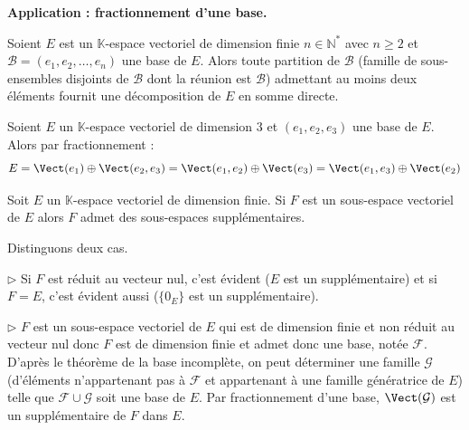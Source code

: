 \documentclass[french,11pt,twoside]{VcCours}
\begin{document}
\textbf{Application : fractionnement d'une base.}

Soient $E$ est un $\mathbb{K}$-espace vectoriel de dimension finie $n \in \mathbb{N}^*$ avec $n \geq 2$ et $\mathcal{B}=(e_1, e_2, \ldots, e_n)$ une base de $E$. Alors toute partition de $\mathcal{B}$ (famille de sous-ensembles disjoints de $\mathcal{B}$ dont la réunion est $\mathcal{B}$) admettant au moins deux éléments fournit une décomposition de $E$ en somme directe.

\medskip

\begin{Exemple} Soient $E$ un $\mathbb{K}$-espace vectoriel de dimension $3$ et $(e_1,e_2,e_3)$ une base de $E$. Alors par fractionnement :
$$ E = \Vect(e_1) \oplus \Vect(e_2,e_3) = \Vect(e_1,e_2) \oplus \Vect(e_3) = \Vect(e_1,e_3) \oplus \Vect(e_2) $$
\end{Exemple}

\medskip

\begin{Corollaire}{} Soit $E$ un $\mathbb{K}$-espace vectoriel de dimension finie. Si $F$ est un sous-espace vectoriel de $E$ alors $F$ admet des sous-espaces supplémentaires.
\end{Corollaire}

\begin{Demonstration}{} Distinguons deux cas.

$\rhd$ Si $F$ est réduit au vecteur nul, c'est évident ($E$ est un supplémentaire) et si $F=E$, c'est évident aussi ($\lbrace 0_E\rbrace$ est un supplémentaire).

\medskip

$\rhd$ $F$ est un sous-espace vectoriel de $E$ qui est de dimension finie et non réduit au vecteur nul donc $F$ est de dimension finie et admet donc une base, notée $\mathcal{F}$. D'après le théorème de la base incomplète, on peut déterminer une famille $\mathcal{G}$ (d'éléments n'appartenant pas à $\mathcal{F}$ et appartenant à une famille génératrice de $E$) telle que $\mathcal{F} \cup \mathcal{G}$ soit une base de $E$. Par fractionnement d'une base, $\Vect(\mathcal{G})$ est un supplémentaire de $F$ dans $E$.
\end{Demonstration}

\medskip
\end{document}
